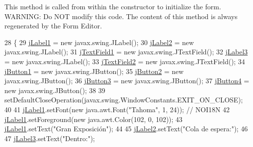 This method is called from within the constructor to initialize the form. W\+A\+R\+N\+I\+NG\+: Do N\+OT modify this code. The content of this method is always regenerated by the Form Editor. 
\begin{DoxyCode}
28     \{
29         \mbox{\hyperlink{classpa__sesion6_1_1_prog_principal_a52f639c7e833b4a261a9de20d1bb8e80}{jLabel1}} = \textcolor{keyword}{new} javax.swing.JLabel();
30         \mbox{\hyperlink{classpa__sesion6_1_1_prog_principal_a43bcbbe1661eb5a6c1cbc52e7f15ef96}{jLabel2}} = \textcolor{keyword}{new} javax.swing.JLabel();
31         \mbox{\hyperlink{classpa__sesion6_1_1_prog_principal_a1b336bc5700d2300c7c85f594b2a67c5}{jTextField1}} = \textcolor{keyword}{new} javax.swing.JTextField();
32         \mbox{\hyperlink{classpa__sesion6_1_1_prog_principal_a4531dd28f71269d0ecd682e0c8f6cc2e}{jLabel3}} = \textcolor{keyword}{new} javax.swing.JLabel();
33         \mbox{\hyperlink{classpa__sesion6_1_1_prog_principal_a0381b47538147a043d91431e3cb981dc}{jTextField2}} = \textcolor{keyword}{new} javax.swing.JTextField();
34         \mbox{\hyperlink{classpa__sesion6_1_1_prog_principal_ac3fa4d920e564a95291a07710b145455}{jButton1}} = \textcolor{keyword}{new} javax.swing.JButton();
35         \mbox{\hyperlink{classpa__sesion6_1_1_prog_principal_a124fb4257898d5e460eed588be9d285c}{jButton2}} = \textcolor{keyword}{new} javax.swing.JButton();
36         \mbox{\hyperlink{classpa__sesion6_1_1_prog_principal_ab47a77238e53b4e0e6d1d5cd5d83620d}{jButton3}} = \textcolor{keyword}{new} javax.swing.JButton();
37         \mbox{\hyperlink{classpa__sesion6_1_1_prog_principal_a9703d219be4d93bd1f6ed81cbfc1af61}{jButton4}} = \textcolor{keyword}{new} javax.swing.JButton();
38  
39         setDefaultCloseOperation(javax.swing.WindowConstants.EXIT\_ON\_CLOSE);
40  
41         \mbox{\hyperlink{classpa__sesion6_1_1_prog_principal_a52f639c7e833b4a261a9de20d1bb8e80}{jLabel1}}.setFont(\textcolor{keyword}{new} java.awt.Font(\textcolor{stringliteral}{"Tahoma"}, 1, 24)); \textcolor{comment}{// NOI18N}
42         \mbox{\hyperlink{classpa__sesion6_1_1_prog_principal_a52f639c7e833b4a261a9de20d1bb8e80}{jLabel1}}.setForeground(\textcolor{keyword}{new} java.awt.Color(102, 0, 102));
43         \mbox{\hyperlink{classpa__sesion6_1_1_prog_principal_a52f639c7e833b4a261a9de20d1bb8e80}{jLabel1}}.setText(\textcolor{stringliteral}{"Gran Exposición"});
44  
45         \mbox{\hyperlink{classpa__sesion6_1_1_prog_principal_a43bcbbe1661eb5a6c1cbc52e7f15ef96}{jLabel2}}.setText(\textcolor{stringliteral}{"Cola de espera:"});
46  
47         \mbox{\hyperlink{classpa__sesion6_1_1_prog_principal_a4531dd28f71269d0ecd682e0c8f6cc2e}{jLabel3}}.setText(\textcolor{stringliteral}{"Dentro:"});

\end{DoxyCode}
